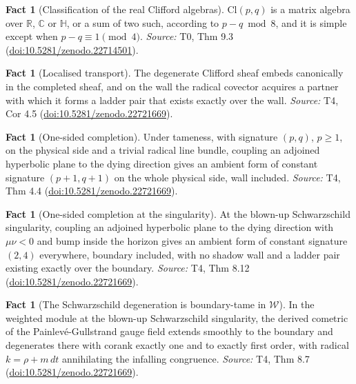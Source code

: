 \documentclass[11pt]{article}
\theoremstyle{definition}
\newtheorem{fact}[theorem]{Fact}
\theoremstyle{plain}
\providecommand{\C}{}\renewcommand{\C}{\mathbb{C}}
\providecommand{\Cl}{}\renewcommand{\Cl}{\mathrm{Cl}}
\providecommand{\HH}{}\renewcommand{\HH}{\mathbb{H}}
\providecommand{\R}{}\renewcommand{\R}{\mathbb{R}}
\providecommand{\dtPG}{}\renewcommand{\dtPG}{dt}
\providecommand{\shW}{}\renewcommand{\shW}{\mathcal{W}}
\begin{document}
\begin{fact}[Classification of the real Clifford algebras]\label{c:primer.classification-real-clifford-algebras}
$\Cl(p,q)$ is a matrix algebra over $\R$, $\C$ or $\HH$, or a sum of two such, according to $p - q \bmod 8$, and it is simple except when $p - q \equiv 1 \pmod 4$.
\emph{Source:} T0, Thm 9.3 (\href{https://doi.org/10.5281/zenodo.22714501}{doi:10.5281/zenodo.22714501}).
\end{fact}

\begin{fact}[Localised transport]\label{c:sheaf.localised-transport}
The degenerate Clifford sheaf embeds canonically in the completed sheaf, and on the wall the radical covector acquires a partner with which it forms a ladder pair that exists exactly over the wall.
\emph{Source:} T4, Cor 4.5 (\href{https://doi.org/10.5281/zenodo.22721669}{doi:10.5281/zenodo.22721669}).
\end{fact}

\begin{fact}[One-sided completion]\label{c:sheaf.one-sided-completion}
Under tameness, with signature $(p,q)$, $p \geq 1$, on the physical side and a trivial radical line bundle, coupling an adjoined hyperbolic plane to the dying direction gives an ambient form of constant signature $(p{+}1, q{+}1)$ on the whole physical side, wall included.
\emph{Source:} T4, Thm 4.4 (\href{https://doi.org/10.5281/zenodo.22721669}{doi:10.5281/zenodo.22721669}).
\end{fact}

\begin{fact}[One-sided completion at the singularity]\label{c:sheaf.one-sided-completion-singularity}
At the blown-up Schwarzschild singularity, coupling an adjoined hyperbolic plane to the dying direction with $\mu\nu < 0$ and bump inside the horizon gives an ambient form of constant signature $(2,4)$ everywhere, boundary included, with no shadow wall and a ladder pair existing exactly over the boundary.
\emph{Source:} T4, Thm 8.12 (\href{https://doi.org/10.5281/zenodo.22721669}{doi:10.5281/zenodo.22721669}).
\end{fact}

\begin{fact}[The Schwarzschild degeneration is boundary-tame in $\shW$]\label{c:sheaf.schwarzschild-degeneration-boundary-tame}
In the weighted module at the blown-up Schwarzschild singularity, the derived cometric of the Painlev\'e-Gullstrand gauge field extends smoothly to the boundary and degenerates there with corank exactly one and to exactly first order, with radical $k = \rho + m\,\dtPG$ annihilating the infalling congruence.
\emph{Source:} T4, Thm 8.7 (\href{https://doi.org/10.5281/zenodo.22721669}{doi:10.5281/zenodo.22721669}).
\end{fact}
\end{document}
